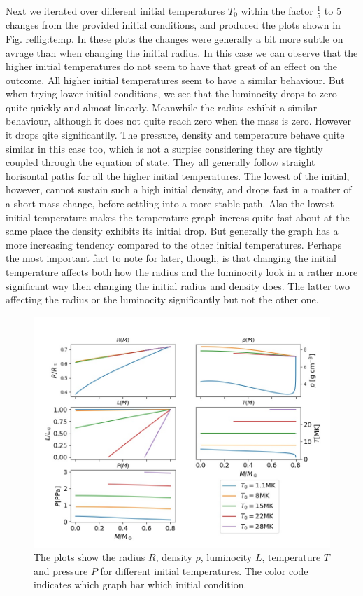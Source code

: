 \documentclass{emulateapj}
\begin{document}
	Next we iterated over different initial temperatures $T_0$ within the factor $\frac{1}{5}$ to 5 changes from the provided initial conditions, and produced the plots shown in Fig. ref{fig:temp}. In these plots the changes were generally a bit more subtle on avrage than when changing the initial radius. In this case we can observe that the higher initial temperatures do not seem to have that great of an effect on the outcome. All higher initial temperatures seem to have a similar behaviour. But when trying lower initial conditions, we see that the luminocity drops to zero quite quickly and almost linearly. Meanwhile the radius exhibit a similar behaviour, although it does not quite reach zero when the mass is zero. However it drops qite significantlly. The pressure, density and temperature behave quite similar in this case too, which is not a surpise considering they are tightly coupled through the equation of state. They all generally follow straight horisontal paths for all the higher initial temperatures. The lowest of the initial, however, cannot sustain such a high initial density, and drops fast in a matter of a short mass change, before settling into a more stable path. Also the lowest initial temperature makes the temperature graph increas quite fast about at the same place the density exhibits its initial drop. But generally the graph has a more increasing tendency compared to the other initial temperatures. Perhaps the most important fact to note for later, though, is that changing the initial temperature affects both how the radius and the luminocity look in a rather more significant way then changing the initial radius and density does. The latter two affecting the radius or the luminocity significantly but not the other one.
	\begin{figure}
		\includegraphics[width = \textwidth]{TempPlot.jpg}
		\caption{The plots show the radius $R$, density $\rho$, luminocity $L$, temperature $T$ and pressure $P$ for different initial temperatures. The color code indicates which graph har which initial condition.}
		\label{fig:temp}
	\end{figure}
\end{document}
